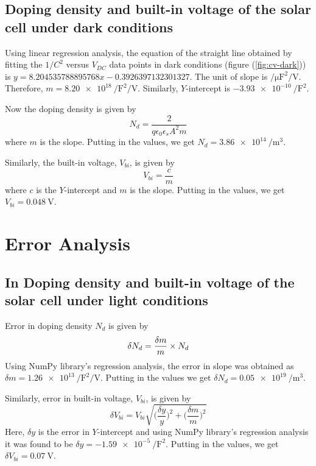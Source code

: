 \documentclass[%
 aip,
 amsmath,amssymb,
 reprint, floatfix%
]{revtex4-2}
\begin{document}
    \subsection{Doping density and built-in voltage of the solar cell under dark conditions}
        Using linear regression analysis, the equation of the straight line obtained by fitting the $1/C^2$ versus $V_{DC}$ data points in dark conditions (figure (\ref{fig:cv-dark})) is $y= 8.204535788895768x -0.3926397132301327$. The unit of slope is $\si{\per \micro \farad \squared \per \volt}$. Therefore, $m = \SI{8.20e18}{\per \farad \squared \per \volt}$. Similarly, $Y$-intercept is $\SI{-3.93e-10}{\per \farad \squared}$.
        \par
        Now the doping density is given by
        \begin{equation}
            N_d = \dfrac{2}{q \epsilon_0 \epsilon_s A^2 m}
        \end{equation}
        where $m$ is the slope. Putting in the values, we get $N_d = \SI{3.86e14}{\per \metre \cubed}$.
        \par
        Similarly, the built-in voltage, $V_{bi}$, is given by
        \begin{equation}
            V_{bi} = \dfrac{c}{m}
        \end{equation}
        where $c$ is the $Y$-intercept and $m$ is the slope. Putting in the values, we get $V_{bi} = \SI{0.048}{\volt}$.
    
\section{Error Analysis}
    \subsection{In Doping density and built-in voltage of the solar cell under light conditions}
        Error in doping density $N_d$ is given by
        \begin{equation}
            \delta N_d = \dfrac{\delta m}{m} \times N_d \\
        \end{equation}
        Using NumPy library's regression analysis, the error in slope was obtained as $\delta m = \SI{1.26e13}{\per \farad \squared \per \volt}$. Putting in the values we get $\delta N_d = \SI{0.05e19}{\per \metre \cubed}$.
        \par
        Similarly, error in built-in voltage, $V_{bi}$, is given by
        \begin{equation}
            \delta V_{bi} = V_{bi} \sqrt{\Big( \dfrac{\delta y}{y} \Big)^2 + \Big( \dfrac{\delta m}{m} \Big)^2}
        \end{equation}
        Here, $\delta y$ is the error in $Y$-intercept and using NumPy library's regression analysis it was found to be $\delta y = \SI{-1.59e-5}{\per \farad \squared}$. Putting in the values, we get $\delta V_{bi} = \SI{0.07}{\volt}$. 
\end{document}
